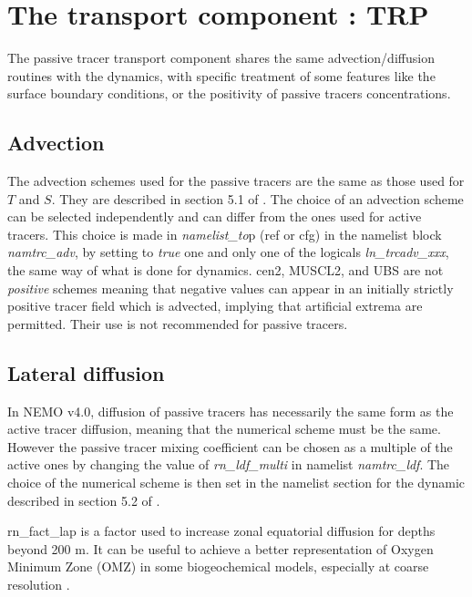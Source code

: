 \documentclass[../main/TOP_manual]{subfiles}
\begin{document}
\section{The transport component : TRP}

The passive tracer transport component shares the same advection/diffusion routines with the dynamics, with specific treatment of some features like the surface boundary conditions, or the positivity of passive tracers concentrations.

\subsection{Advection}

The advection schemes used for the passive tracers are the same as those used for $T$ and $S$. They are described in section 5.1 of \cite{nemo_manual}.
The choice of an advection scheme can be selected independently and can differ from the ones used for active tracers.
This choice is made in \textit{namelist\_to}p (ref or cfg) in the namelist block \textit{namtrc\_adv}, by setting to \textit{true} one and only one of the logicals \textit{ln\_trcadv\_xxx}, the same way of what is done for dynamics.
cen2, MUSCL2, and UBS are not \textit{positive} schemes meaning that negative values can appear in an initially strictly positive tracer field which is advected, implying that artificial extrema are permitted. Their use is not recommended for passive tracers.


\subsection{Lateral diffusion}

In NEMO v4.0, diffusion of passive tracers has necessarily the same form as the active tracer diffusion, meaning that the numerical scheme must be the same.
However the passive tracer mixing coefficient can be chosen as a multiple of the active ones by changing the value of \textit{rn\_ldf\_multi} in namelist \textit{namtrc\_ldf}.
The choice of the numerical scheme is then set in the  namelist section for the dynamic described in section 5.2 of \cite{nemo_manual}.

rn\_fact\_lap is a factor used to increase zonal equatorial diffusion for depths beyond 200 m. It can be useful to achieve a better representation of Oxygen Minimum Zone (OMZ) in some biogeochemical models, especially at coarse resolution \citep{getzlaff_2013}.
\end{document}
